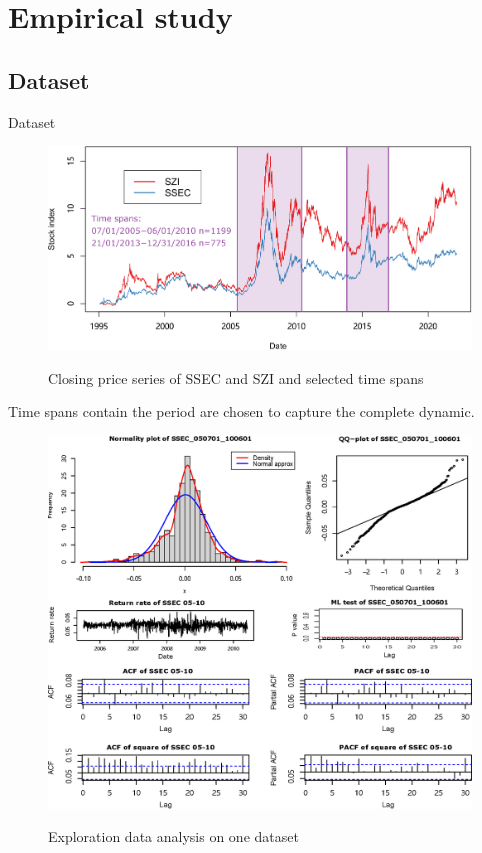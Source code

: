   
  
\section{Empirical study}
\subsection{Dataset}
\begin{frame}{Dataset}
  \vspace{-10pt}
  \begin{figure}[htbp]
    \centering
    \caption{Closing price series of SSEC and SZI and selected time spans}
    \includegraphics[width = 1\columnwidth]{fig/Closed index series of SSEC and SZI_trimed_modified.eps}
    \label{fig: Closed index series of SSEC and SZI and selected time spans}
  \end{figure}

  \vspace{-20pt}
  Time spans contain the  period are chosen to capture the complete dynamic.
\end{frame}

\begin{frame}
  \vspace{-5pt}
  \begin{figure}[htbp]
    \centering
    \caption{Exploration data analysis on one dataset}
    \includegraphics[width = .75\columnwidth]{fig/combine.eps}
    \label{fig: Exploration data analysis on one dataset}
  \end{figure}
\end{frame}


